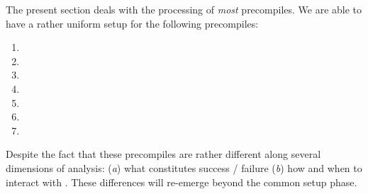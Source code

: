 The present section deals with the \hubMod{} processing of \emph{most} precompiles. We are able to have a rather uniform setup for the following precompiles:
\begin{multicols}{3}
\begin{enumerate}
    \item \instEcrecover{}
    \item \instShaTwo{}
    \item \instRipemd{}
    \item \instIdentity{}
    \item \instEcadd{}
    \item \instEcmul{}
    \item \instEcpairing{}
\end{enumerate}
\end{multicols}
Despite the fact that these precompiles are rather different along several dimensions of analysis:
(\emph{a}) what constitutes success / failure
(\emph{b}) how and when to interact with .
These differences will re-emerge beyond the common setup phase.
